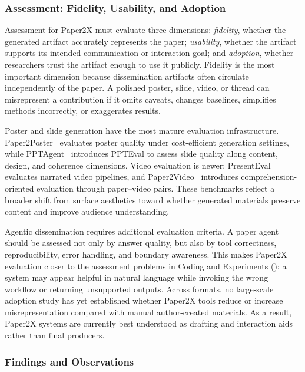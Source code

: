\subsubsection{Assessment: Fidelity, Usability, and Adoption}

\label{sec:paper2x_eval}

Assessment for Paper2X must evaluate three dimensions: \emph{fidelity}, whether the generated artifact accurately represents the paper; \emph{usability}, whether the artifact supports its intended communication or interaction goal; and \emph{adoption}, whether researchers trust the artifact enough to use it publicly. Fidelity is the most important dimension because dissemination artifacts often circulate independently of the paper. A polished poster, slide, video, or thread can misrepresent a contribution if it omits caveats, changes baselines, simplifies methods incorrectly, or exaggerates results.

Poster and slide generation have the most mature evaluation infrastructure. Paper2Poster~\cite{paper2poster2025} evaluates poster quality under cost-efficient generation settings, while PPTAgent~\cite{pptagent2025} introduces PPTEval to assess slide quality along content, design, and coherence dimensions. Video evaluation is newer: PresentEval~\cite{presentagent2025} evaluates narrated video pipelines, and Paper2Video~\cite{paper2video2025} introduces comprehension-oriented evaluation through paper--video pairs. These benchmarks reflect a broader shift from surface aesthetics toward whether generated materials preserve content and improve audience understanding.

Agentic dissemination requires additional evaluation criteria. A paper agent should be assessed not only by answer quality, but also by tool correctness, reproducibility, error handling, and boundary awareness. This makes Paper2X evaluation closer to the assessment problems in Coding and Experiments (\Sthree): a system may appear helpful in natural language while invoking the wrong workflow or returning unsupported outputs. Across formats, no large-scale adoption study has yet established whether Paper2X tools reduce or increase misrepresentation compared with manual author-created materials. As a result, Paper2X systems are currently best understood as drafting and interaction aids rather than final producers.



\subsubsection{Findings and Observations}
\label{sec:s8_findings}

